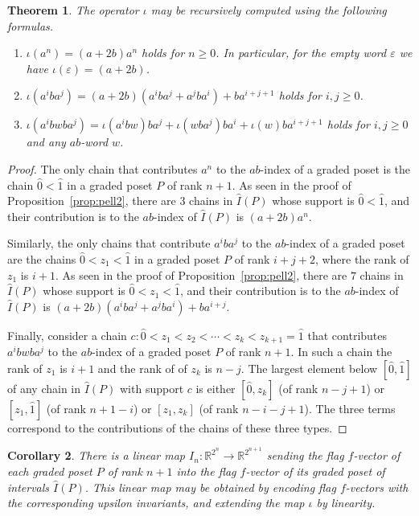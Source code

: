 \documentclass[reqno,12pt]{amsart}
\numberwithin{equation}{section}
\newtheorem{theorem}{Theorem}[section]
\newtheorem{corollary}[theorem]{Corollary}
\newcommand{\0}{\widehat{0}}
\newcommand{\1}{\widehat{1}}
\newcommand{\2}{\widehat{2}}
\newcommand{\grI}{\widehat{I}}
\newcommand{\iab}{\iota}
\begin{document}
\begin{theorem}
\label{thm:itransf}
  The operator $\iab$ may be recursively computed using the following formulas.
  \begin{enumerate}
  \item $\iab(a^n)=(a+2b)a^n$ holds for $n\geq 0$. In particular, for
    the empty word $\varepsilon$ we have $\iab(\varepsilon)=(a+2b)$.
  \item $\iab(a^iba^j)=(a+2b)(a^iba^j+a^jba^i)+ba^{i+j+1}$ holds for
    $i,j\geq 0$.
  \item
    $\iab(a^ibwba^j)=\iab(a^ibw)ba^j+\iab(wba^j)ba^i+\iab(w)ba^{i+j+1}$
    holds for $i,j\geq 0$ and any $ab$-word $w$.   
\end{enumerate}    
\end{theorem}  
\begin{proof}
The only chain that contributes $a^n$ to the $ab$-index of a graded
poset is the chain $\0<\1$ in a graded poset $P$ of rank $n+1$. As seen in
the proof of Proposition~\ref{prop:pell2}, there are $3$ chains in
$\grI(P)$ whose support is  $\0<\1$, and their contribution is to the
$ab$-index of $\grI(P)$ is $(a+2b)a^n$.

Similarly, the only chains that contribute $a^iba^j$ to the $ab$-index
of a graded poset are the chains $\0<z_1<\1$ in a graded poset $P$ of rank
$i+j+2$, where the rank of $z_1$ is $i+1$. As seen in 
the proof of Proposition~\ref{prop:pell2}, there are $7$ chains in
$\grI(P)$ whose support is  $\0<z_1<\1$, and their contribution is to the
$ab$-index of $\grI(P)$ is $(a+2b)(a^iba^j+a^jba^i)+ba^{i+j}$.

  
Finally, consider a chain $c:\0<z_1<z_2<\cdots <z_{k}<z_{k+1}=\1$ that
contributes $a^ibwba^j$ to the $ab$-index of a graded poset $P$ of rank
$n+1$. In such a chain the rank of $z_1$ is $i+1$ and the rank of of
$z_k$ is $n-j$.  The
largest element below $[\0,\1]$ of any chain in $\grI(P)$ with support
$c$ is either $[\0,z_k]$ (of rank $n-j+1$)  or $[z_1,\1]$ (of rank
$n+1-i$) or $[z_1,z_k]$ (of rank $n-i-j+1$). The three terms correspond
to the contributions of the chains of these three types. 
\end{proof}

\begin{corollary}
There is a linear map $I_n:{\mathbb R}^{2^n}\rightarrow {\mathbb
  R}^{2^{n+1}}$ sending the flag $f$-vector of each graded poset $P$ of
rank $n+1$  into the flag $f$-vector of its graded poset of intervals
$\grI(P)$. This linear map may be obtained by encoding flag $f$-vectors
with the corresponding upsilon invariants, and extending the map $\iab$
by linearity. 
\end{corollary}  
\end{document}
